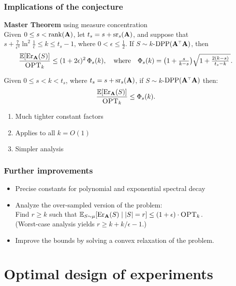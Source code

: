 \documentclass[10pt]{beamer}
\begin{document}
\begin{frame}
  \frametitle{Implications of the conjecture}
\textbf{Master Theorem} using measure concentration\\[2mm]
  Given $0\leq s<\mathrm{rank}(\mathbf A) $, let  $t_s = s+{\mathrm{sr}}_s(\mathbf A)$,
and suppose that $s+ \frac7{\epsilon^4}\ln^2\!\frac1\epsilon \leq k\leq t_s-1$,
where $0<\epsilon\leq\frac12$. If $S\sim k$-$\DPP(\A^\top\A)$, then
\begin{align*}
  \frac{\mathbb E[\mathrm{Er}_\mathbf A(S)]}{{\textsc{OPT}_k}}\leq (1+2\epsilon)^2\,\Phi_{s}(k),
  \quad\text{where}\quad \Phi_s(k)=\big(1+\tfrac{s}{k-s}\big)\sqrt{1 + \tfrac{2(k-s)}{t_s-k}\,}.
\end{align*}
\pause

\begin{theorem}
  Given $0\leq s<k<t_s$, where $t_s= s+{\mathrm{sr}}_s(\mathbf A)$, if $S\sim
  k$-$\DPP(\A^\top\A)$ then:
  \begin{align*}
    \frac{\mathbb E[\mathrm{Er}_{\mathbf A}(S)]}{{\textsc{OPT}_k}} \leq \Phi_s(k).
  \end{align*}
\end{theorem}
\pause
\begin{enumerate}
\item Much tighter constant factors
\item Applies to all $k=O(1)$
\item Simpler analysis
\end{enumerate}
\end{frame}

\begin{frame}
  \frametitle{Further improvements}

  \begin{itemize}
  \item Precise constants for polynomial and exponential spectral decay
\vspace{5mm}\pause
    \item Analyze the over-sampled version of the problem:\\
      Find $r\geq k$ such that $\mathbb E_{S\sim\mu}[\mathrm{Er}_{\mathbf A}(S)\mid
      |S|=r] \leq (1+\epsilon)\cdot {\textsc{OPT}_k}$.\\
      (Worst-case analysis yields $r\geq k+k/\epsilon-1$.)
\vspace{5mm}\pause
      \item Improve the bounds by solving a convex relaxation of the problem.
  \end{itemize}
\end{frame}

\section{Optimal design of experiments}
\end{document}
